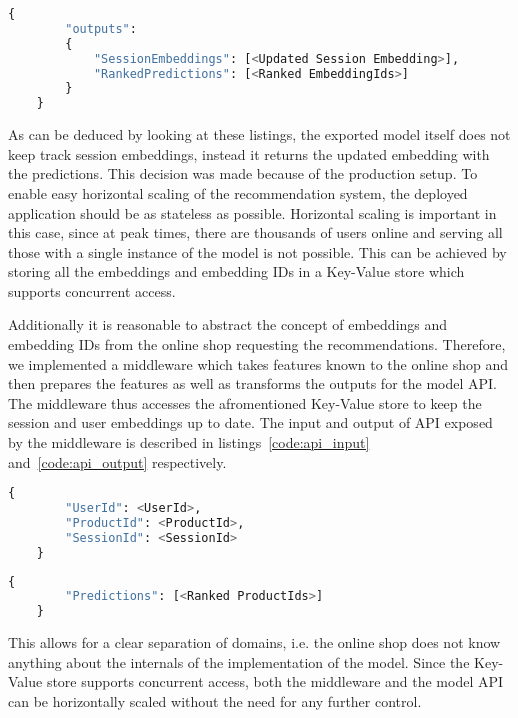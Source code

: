 \begin{minipage}{\linewidth}
    \begin{lstlisting}[language=Python,frame=single,caption=TF Serve API Output,label=code:tf_serve_output]
    {
        "outputs": 
        {
            "SessionEmbeddings": [<Updated Session Embedding>],
            "RankedPredictions": [<Ranked EmbeddingIds>]
        }
    }
    \end{lstlisting}
\end{minipage}
As can be deduced by looking at these listings, the exported model itself does not keep track session embeddings, instead it returns the updated embedding with the predictions.
This decision was made because of the production setup.
To enable easy horizontal scaling of the recommendation system, the deployed application should be as stateless as possible.
Horizontal scaling is important in this case, since at peak times, there are thousands of users online and serving all those with a single instance of the model is not possible.
This can be achieved by storing all the embeddings and embedding IDs in a Key-Value store which supports concurrent access.
\par
Additionally it is reasonable to abstract the concept of embeddings and embedding IDs from the online shop requesting the recommendations.
Therefore, we implemented a middleware which takes features known to the online shop and then prepares the features as well as transforms the outputs for the model API.
The middleware thus accesses the afromentioned Key-Value store to keep the session and user embeddings up to date.
The input and output of API exposed by the middleware is described in listings~\ref{code:api_input} and~\ref{code:api_output} respectively.
\begin{minipage}{\linewidth}
    \begin{lstlisting}[language=Python,frame=single,caption=Middleware API Input,label=code:api_input]
    {
        "UserId": <UserId>,
        "ProductId": <ProductId>,
        "SessionId": <SessionId>
    }
    \end{lstlisting}
\end{minipage}

\begin{minipage}{\linewidth}
    \begin{lstlisting}[language=Python,frame=single,caption=Middleware API Output,label=code:api_output]
    {
        "Predictions": [<Ranked ProductIds>]
    }
    \end{lstlisting}
\end{minipage}
This allows for a clear separation of domains, i.e. the online shop does not know anything about the internals of the implementation of the model.
Since the Key-Value store supports concurrent access, both the middleware and the model API can be horizontally scaled without the need for any further control.
